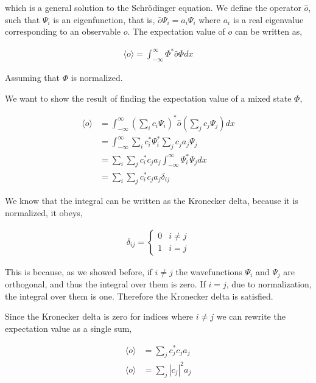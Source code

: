 \documentclass[11pt]{amsart}
\begin{document}
which is a general solution to the Schr\"{o}dinger equation. We define the operator $\hat{o}$, such that $\Psi_i$ is an eigenfunction, that is, $\hat{o}\Psi_i = a_i\Psi_i$ where $a_i$ is a real eigenvalue corresponding to an observable $o$. The expectation value of $o$ can be written as,

\begin{align*}
  \langle o\rangle = \int_{-\infty}^{\infty} \Phi^* \hat{o} \Phi dx
\end{align*}

Assuming that $\Phi$ is normalized.

We want to show the result of finding the expectation value of a mixed state $\Phi$,

\begin{align*}
  \langle o\rangle &= \int_{-\infty}^{\infty} \left(\sum\limits_i c_i \Psi_i\right)^* \hat{o} \left(\sum\limits_j c_j \Psi_j\right) dx \\
                   &= \int_{-\infty}^{\infty} \sum\limits_i c_i^* \Psi_i^* \sum\limits_j c_j a_j \Psi_j \\
                   &= \sum\limits_i\sum\limits_j c_i^* c_j a_j \int_{-\infty}^{\infty} \Psi_i^*\Psi_j dx \\
                   &= \sum\limits_i\sum\limits_j c_i^* c_j a_j \delta_{ij}
\end{align*}

We know that the integral can be written as the Kronecker delta, because it is normalized, it obeys,

\begin{align*}
  \delta_{ij} =
  \begin{cases}
    0 & i \neq j \\
    1 & i = j
  \end{cases}
\end{align*}

This is because, as we showed before, if $i \neq j$ the wavefunctions $\Psi_i$ and $\Psi_j$ are orthogonal, and thus the integral over them is zero. If $i = j$, due to normalization, the integral over them is one. Therefore the Kronecker delta is satisfied.

Since the Kronecker delta is zero for indices where $i \neq j$ we can rewrite the expectation value as a single sum,

\begin{align*}
  \langle o\rangle &= \sum\limits_j c_j^* c_j a_j \\
  \langle o\rangle &= \sum\limits_j {|c_j|}^2 a_j
\end{align*}
\end{document}
